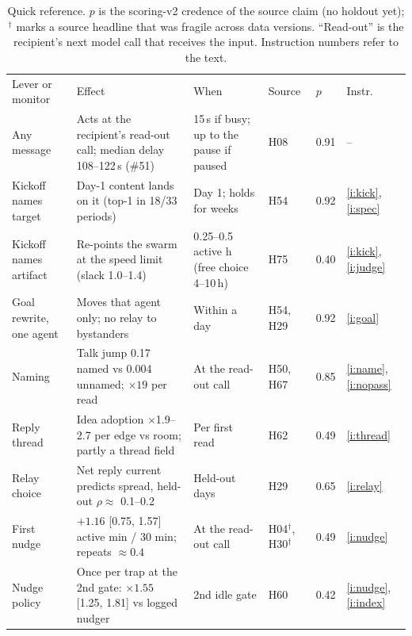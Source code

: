 \documentclass[aps,pre,reprint,10pt,nofootinbib]{revtex4-2}
\begin{document}
\begin{table}[p]
\caption{Quick reference. $p$ is the scoring-v2 credence of the source claim (no holdout yet); $^\dagger$ marks a source headline that was fragile across data versions. ``Read-out'' is the recipient's next model call that receives the input. Instruction numbers refer to the text.}
\label{tab:quickref}
\small
\renewcommand{\arraystretch}{1.3}
\begin{ruledtabular}
\begin{tabular}{p{}p{}p{}p{}ll}
\raggedright Lever or monitor & \raggedright Effect & \raggedright When & \raggedright Source & $p$ & Instr. \tabularnewline
\colrule
\raggedright Any message & \raggedright Acts at the recipient's read-out call; median delay 108--122\,s (\#51) & \raggedright 15\,s if busy; up to the pause if paused & \raggedright H08 & 0.91 & -- \tabularnewline
\raggedright Kickoff names target & \raggedright Day-1 content lands on it (top-1 in 18/33 periods) & \raggedright Day 1; holds for weeks & \raggedright H54 & 0.92 & \ref{i:kick}, \ref{i:spec} \tabularnewline
\raggedright Kickoff names artifact & \raggedright Re-points the swarm at the speed limit (slack 1.0--1.4) & \raggedright 0.25--0.5 active h (free choice 4--10\,h) & \raggedright H75 & 0.40 & \ref{i:kick}, \ref{i:judge} \tabularnewline
\raggedright Goal rewrite, one agent & \raggedright Moves that agent only; no relay to bystanders & \raggedright Within a day & \raggedright H54, H29 & 0.92 & \ref{i:goal} \tabularnewline
\raggedright Naming & \raggedright Talk jump 0.17 named vs 0.004 unnamed; $\times19$ per read & \raggedright At the read-out call & \raggedright H50, H67 & 0.85 & \ref{i:name}, \ref{i:nopass} \tabularnewline
\raggedright Reply thread & \raggedright Idea adoption $\times$1.9--2.7 per edge vs room; partly a thread field & \raggedright Per first read & \raggedright H62 & 0.49 & \ref{i:thread} \tabularnewline
\raggedright Relay choice & \raggedright Net reply current predicts spread, held-out $\rho\approx$ 0.1--0.2 & \raggedright Held-out days & \raggedright H29 & 0.65 & \ref{i:relay} \tabularnewline
\raggedright First nudge & \raggedright $+1.16$ [0.75, 1.57] active min / 30 min; repeats $\approx0.4$ & \raggedright At the read-out call & \raggedright H04$^\dagger$, H30$^\dagger$ & 0.49 & \ref{i:nudge} \tabularnewline
\raggedright Nudge policy & \raggedright Once per trap at the 2nd gate: $\times1.55$ [1.25, 1.81] vs logged nudger & \raggedright 2nd idle gate & \raggedright H60 & 0.42 & \ref{i:nudge}, \ref{i:index} \tabularnewline

\end{tabular}
\end{ruledtabular}
\end{table}
\end{document}
